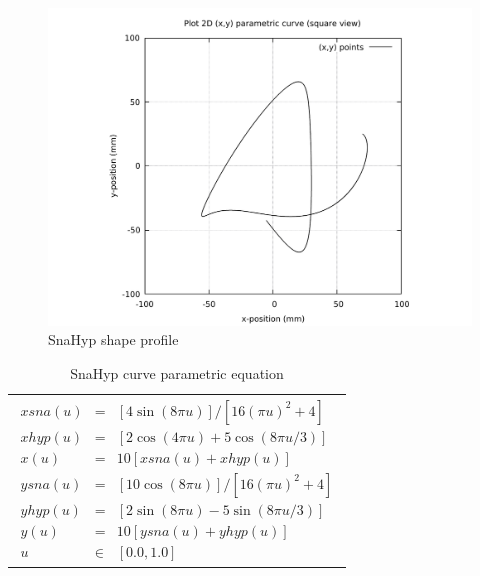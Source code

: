 \begin{figure}
	\caption{SnaHyp shape profile}
	\label{SnaHyp-curve-plot-BW.pdf}
	\centering
	\includegraphics[width=1.20\textwidth]{Chap3/curve-shape/curves/SnaHyp-curve-plot-BW.pdf} 
\end{figure}

\begin{table}[ht]
\begin{center}
\begin{tabular}{ p{16.0cm} }
\caption{SnaHyp curve parametric equation}
\begin{eqnarray}
	xsna(u) & = & [4\sin(8\pi u) ] / [16 (\pi u)^2 + 4] \nonumber \\
	xhyp(u) & = & [2\cos(4\pi u)  + 5\cos(8\pi u /3)  ] \nonumber \\
	x(u) & = & 10[xsna(u) + xhyp(u)] \nonumber \\
	ysna(u) & = & [10\cos(8\pi u)] / [16 (\pi u)^2 + 4] \nonumber \\
	yhyp(u) & = & [2\sin(8\pi u) - 5\sin(8\pi u /3)] \nonumber \\
	y(u) & = & 10[ysna(u) + yhyp(u)] \nonumber \\
	u & \in & [0.0, 1.0] \nonumber
\end{eqnarray}
\end{tabular}
\end{center}
\end{table}

\clearpage
\pagebreak

